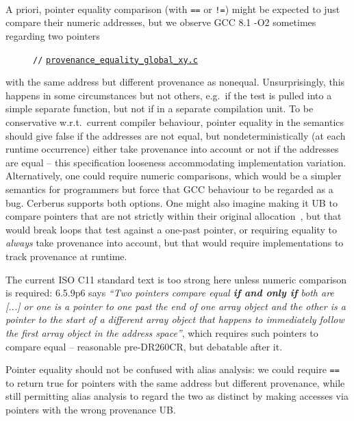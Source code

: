 \documentclass[acmsmall,review,screen]{acmart}\settopmatter{printfolios=true,printccs=false,printacmref=false}
\newcommand{\myparagraph}[1]{\vspace{0.5\baselineskip}\par\noindent{\normalsize\bfseries{#1}}\quad}
\newcommand{\mytesturl}[1]{https://cerberus.cl.cam.ac.uk/cerberus?defacto/#1}
\newcommand{\mytestlink}[2]{\href{\mytesturl{#1}}{#2}}
\newcommand{\mylsttestlink}[1]{\mytestlink{#1}{\lstinline{#1}}}
\newcommand{\mylistingmargin}{5mm}
\newcommand{\myfooexample}[3]{{\vspace*{-0.5\baselineskip}\par{\noindent\small\hspace*{\mylistingmargin}\lstinline{//} \mylsttestlink{#2}\vspace*{0.25\baselineskip}\par}}}
\begin{document}
\

\

\ 


\myparagraph{Pointer equality comparison and provenance}
%
A priori, pointer equality comparison (with \lstinline{==} or \lstinline{!=}) might be expected
to just compare their numeric addresses, but 
we observe GCC 8.1 -O2 sometimes
regarding two pointers
\begin{figure}
{\renewcommand{\mylistingmargin}{0mm}\myfooexample{charon_tests/}{provenance_equality_global_xy.c}{}%
}
\vspace*{-0\baselineskip}
\end{figure}
with the same address but different provenance
as nonequal. Unsurprisingly, this happens in
some circumstances but not others, e.g.~if the test is pulled into a
simple separate function, but not if in a separate compilation unit.
To be conservative w.r.t.~current compiler behaviour, pointer
equality in the semantics should give false if the addresses are not equal, but 
nondeterministically (at each runtime occurrence) either take provenance into
account or not if the addresses are equal -- this specification looseness accommodating 
implementation variation. 
Alternatively, one could require numeric comparisons, which would be a
simpler semantics for programmers but force that GCC behaviour to be regarded as a 
bug.  Cerberus supports both options.
One might also imagine making it UB to compare pointers that are not strictly within
their original allocation~\cite{krebbers-phd}, but that would
break loops that test against a one-past pointer, or 
requiring equality to \emph{always} take provenance into account, but
that would require implementations to track provenance at runtime.

The current ISO C11 standard text is too strong here unless numeric
comparison is required: 6.5.9p6 says \emph{``Two
pointers compare equal {\bfseries{}if and only if} both are [...] or one is a
pointer to one past the end of one array object and the other is a
pointer to the start of a different array object that happens to
immediately follow the first array object in the address space''},
which requires such pointers to compare equal -- reasonable pre-DR260CR,
but debatable after it.

Pointer equality should not be confused with alias analysis: we could
require \lstinline{==} to return true for pointers with the same
address but different provenance, while still permitting alias
analysis to regard the two as distinct by making accesses via pointers
with the wrong provenance UB.
\end{document}
